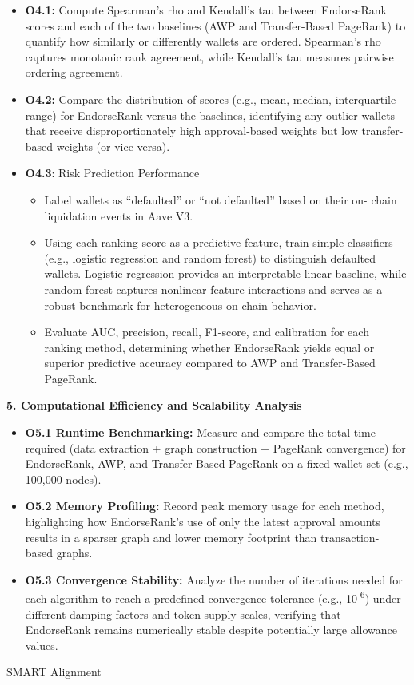 \documentclass[12pt]{article}
\newcommand{\proposalSubheading}[1]{%
  \par\addvspace{0.38\baselineskip}%
  \noindent\textbf{#1}\par\nobreak\addvspace{0.08\baselineskip}%
}
\begin{document}
\begin{itemize}
\item[\textbullet] \textbf{O4.1: }Compute\textbf{ }Spearman's rho and Kendall's tau between EndorseRank scores and each of the two baselines (AWP and Transfer-Based PageRank) to quantify how similarly or differently wallets are ordered. Spearman's rho captures monotonic rank agreement, while Kendall's tau measures pairwise ordering agreement.
\item[\textbullet] \textbf{O4.2:}\textbf{ }Compare the distribution of scores (e.g., mean, median, interquartile range) for EndorseRank versus the baselines, identifying any outlier wallets that receive disproportionately high approval-based weights but low transfer-based weights (or vice versa).
\item[\textbullet] \textbf{O4.3}: Risk Prediction Performance
\begin{itemize}
\item[\textendash] Label wallets as ``defaulted'' or ``not defaulted'' based on their on- chain liquidation events in Aave V3.
\item[\textendash] Using each ranking score as a predictive feature, train simple classifiers (e.g., logistic regression and random forest) to distinguish defaulted wallets. Logistic regression provides an interpretable linear baseline, while random forest captures nonlinear feature interactions and serves as a robust benchmark for heterogeneous on-chain behavior.
\item[\textendash] Evaluate AUC, precision, recall, F1-score, and calibration for each ranking method, determining whether EndorseRank yields equal or superior predictive accuracy compared to AWP and Transfer-Based PageRank.
\end{itemize}
\end{itemize}
\proposalSubheading{5. Computational Efficiency and Scalability Analysis}

\begin{itemize}
\item[\textbullet] \textbf{O5.1 Runtime Benchmarking: }Measure and compare the total time required (data extraction + graph construction + PageRank convergence) for EndorseRank, AWP, and Transfer-Based PageRank on a fixed wallet set (e.g., 100,000 nodes).
\item[\textbullet] \textbf{O5.2 Memory Profiling: }Record peak memory usage for each method, highlighting how EndorseRank's use of only the latest approval amounts results in a sparser graph and lower memory footprint than transaction- based graphs.
\item[\textbullet] \textbf{O5.3 Convergence Stability}\textbf{: }Analyze the number of iterations needed for each algorithm to reach a predefined convergence tolerance (e.g., 10\textsuperscript{-}\textsuperscript{6}) under different damping factors and token supply scales, verifying that EndorseRank remains numerically stable despite potentially large allowance values.
\end{itemize}
SMART Alignment
\end{document}
